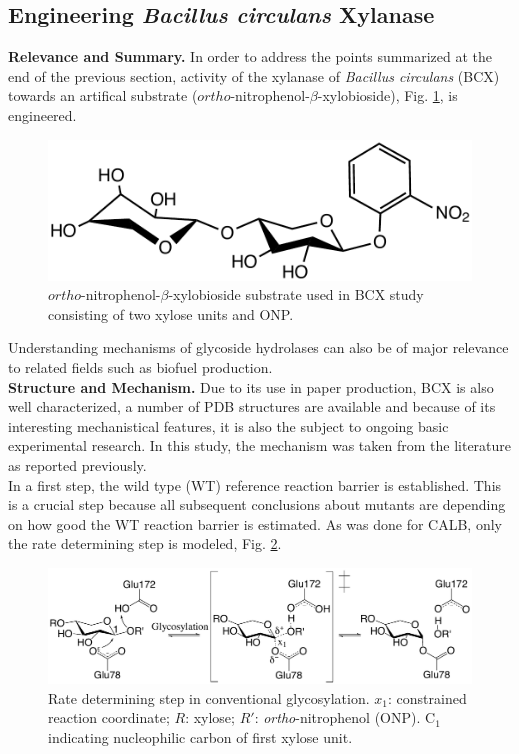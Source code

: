\subsection{Engineering \textit{Bacillus circulans} Xylanase}
\textbf{Relevance and Summary.}
In order to address the points summarized at the end of the previous section, activity of the xylanase of \textit{Bacillus circulans} (BCX) towards an artifical substrate ($ortho$-nitrophenol-$\beta$-xylobioside), Fig. \ref{fig:substrate}, is engineered.
\begin{figure}[htbp] 
\centering
\includegraphics[width=0.85\linewidth]{substrate.pdf}
\caption{
$ortho$-nitrophenol-$\beta$-xylobioside substrate used in BCX study consisting of two xylose units and ONP.
}
\label{fig:substrate}
\end{figure}
Understanding mechanisms of glycoside hydrolases can also be of major relevance to related fields such as biofuel production\cite{ragauskas2006path, yeoman2010thermostable, zhang2011vital, gao2013increased}.\\
\textbf{Structure and Mechanism.}
Due to its use in paper production\cite{bajpai1999application, buchert1994application}, BCX is also well characterized, a number of PDB structures are available and because of its interesting mechanistical features, it is also the subject to ongoing basic experimental research\cite{ludwiczek2013strategies}.
In this study, the mechanism was taken from the literature as reported previously\cite{joshi2000hydrogen,joshi2001dissecting}.\\
In a first step, the wild type (WT) reference reaction barrier is established.
This is a crucial step because all subsequent conclusions about mutants are depending on how good the WT reaction barrier is estimated.
As was done for CALB, only the rate determining step is modeled, Fig. \ref{fig:bcx_mechanism}.
\begin{figure}[htbp] 
\centering
\includegraphics[width=1.0\linewidth]{mechanism.pdf}
\caption{
Rate determining step in conventional glycosylation. $x_1$: constrained reaction coordinate; $R$: xylose; 
$R'$: \textit{ortho}-nitrophenol (ONP).
C$_1$ indicating nucleophilic carbon of first xylose unit\cite{hediger2013computational}.
}
\label{fig:bcx_mechanism}
\end{figure}
